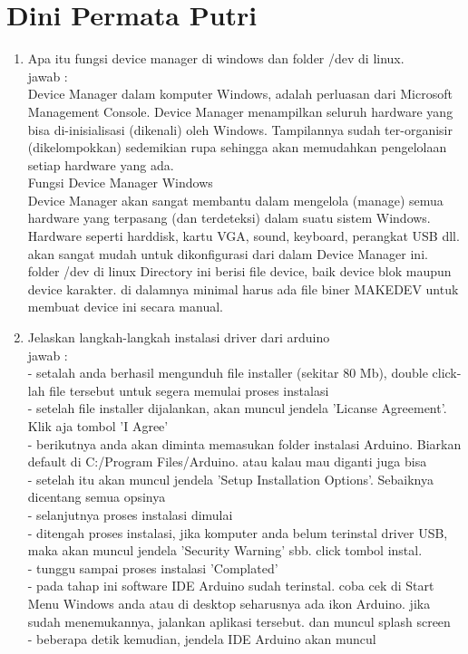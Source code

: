 \section{Dini Permata Putri}
\begin{enumerate}

\item Apa itu fungsi device manager di windows dan folder /dev di linux.\\
jawab : \\
Device Manager dalam komputer Windows, adalah perluasan dari Microsoft Management Console. Device Manager menampilkan seluruh hardware yang bisa di-inisialisasi (dikenali) oleh Windows. Tampilannya sudah ter-organisir (dikelompokkan) sedemikian rupa sehingga akan memudahkan pengelolaan setiap hardware yang ada.\\

Fungsi Device Manager Windows\\
Device Manager akan sangat membantu dalam mengelola (manage) semua hardware yang terpasang (dan terdeteksi) dalam suatu sistem Windows. Hardware seperti harddisk, kartu VGA, sound, keyboard, perangkat USB dll. akan sangat mudah untuk dikonfigurasi dari dalam Device Manager ini.\\
folder /dev di linux
Directory ini berisi file device, baik device blok maupun device karakter. di dalamnya minimal harus ada file biner MAKEDEV untuk membuat device ini secara manual.\\

\item Jelaskan langkah-langkah instalasi driver dari arduino\\
jawab :\\
- setalah anda berhasil mengunduh file installer (sekitar 80 Mb), double click-lah file tersebut untuk segera memulai proses instalasi\\
- setelah file installer dijalankan, akan muncul jendela 'Licanse Agreement'. Klik aja tombol 'I Agree'\\
- berikutnya anda akan diminta memasukan folder instalasi Arduino. Biarkan default di C:/Program Files/Arduino. atau kalau mau diganti juga bisa\\
- setelah itu akan muncul jendela 'Setup Installation Options'. Sebaiknya dicentang semua opsinya\\
- selanjutnya proses instalasi dimulai\\
- ditengah proses instalasi, jika komputer anda belum terinstal driver USB, maka akan muncul jendela 'Security Warning' sbb. click tombol instal.\\
- tunggu sampai proses instalasi 'Complated'\\
- pada tahap ini software IDE Arduino sudah terinstal. coba cek di Start Menu Windows anda atau di desktop seharusnya ada ikon Arduino. jika sudah menemukannya, jalankan aplikasi tersebut. dan muncul splash screen\\
- beberapa detik kemudian, jendela IDE Arduino akan muncul\\


\end{enumerate}
